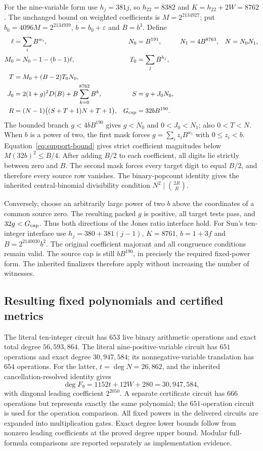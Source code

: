 For the nine-variable form use $h_j=381j$, so
$h_{22}=8382$ and $K=h_{22}+2W=8762$.
The unchanged bound on weighted coefficients is
$M=2^{2134927}$; put $b_0=4096M=2^{2134939}$,
$b=b_0+\varepsilon$ and $B=b^3$. Define
\begin{align*}
 \ell&=\sum_iB^{w_i},& N_0&=B^{191},&N_1&=4B^{8763},&N&=N_0N_1,\\
 M_0&=N_0-1-(b-1)\ell,& T_0&=\sum_jB^{h_j},\\
 T&=M_0+(B-2)T_0N_0,\\
 J_0&=2(1+g)^2D(B)+B\sum_{k=0}^{8762}B^k,& S&=g+J_0N_0,\\
 R&=(N-1)\bigl((S+T+1)N+T+1\bigr),&G_{\rm cap}&=32bB^{190}.
\end{align*}
The bounded branch $g<4bB^{190}$ gives $g<N_0$ and $0<J_0<N_1$;
also $0<T<N$. When $b$ is a power of two, the first mask forces
$g=\sum_i z_iB^{w_i}$ with $0\leq z_i<b$.
Equation~\eqref{eq:support-bound} gives strict coefficient magnitudes
below $M(32b)^2\leq B/4$. After adding $B/2$ to each coefficient, all
digits lie strictly between zero and $B$. The second mask forces every
target digit to equal $B/2$, and therefore every source row vanishes.
The binary-popcount identity gives the inherited central-binomial
divisibility condition $N^2\mid\binom{2R}{R}$.

Conversely, choose an arbitrarily large power of two $b$ above the
coordinates of a common source zero. The resulting packed $g$ is positive,
all target tests pass, and $32g<G_{\rm cap}$. Thus both directions of the
Jones ratio interface hold. For Sun's ten-integer interface use
$h_j=380+381(j-1)$, $K=8761$, $b=1+3f$ and
$B=2^{2140030}b^2$. The original coefficient majorant and all congruence
conditions remain valid. The source cap is still $bB^{190}$, in precisely
the required fixed-power form. The inherited finalizers therefore apply
without increasing the number of witnesses.

\subsection{Resulting fixed polynomials and certified metrics}
The literal ten-integer circuit has $653$ live binary arithmetic operations
and exact total degree $56{,}593{,}864$. The literal nine-positive-variable
circuit has $651$ operations and exact degree $30{,}947{,}584$; its
nonnegative-variable translation has $654$ operations. For the latter,
$t=\deg N=26{,}862$, and the inherited cancellation-resolved identity gives
\[
 \deg F_9=1152t+12W+280=30{,}947{,}584,
\]
with diagonal leading coefficient $2^{2050}$. A separate certificate circuit
has $666$ operations but represents exactly the same polynomial; the
$651$-operation circuit is used for the operation comparison.
All fixed powers in the delivered circuits are expanded into multiplication
gates. Exact degree lower bounds follow from nonzero leading coefficients
at the proved degree upper bound. Modular full-formula comparisons are
reported separately as implementation evidence.

